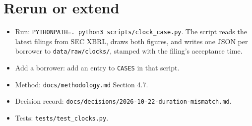 \documentclass[11pt,a4paper]{article}
\newcommand{\code}[1]{\texttt{\small #1}}
\begin{document}
\section{Rerun or extend}
\begin{itemize}
\item Run: \code{PYTHONPATH=. python3 scripts/clock\_case.py}. The script reads the latest filings from SEC XBRL, draws both figures, and writes one JSON per borrower to \code{data/raw/clocks/}, stamped with the filing's acceptance time.
\item Add a borrower: add an entry to \code{CASES} in that script.
\item Method: \code{docs/methodology.md} Section 4.7.
\item Decision record: \code{docs/decisions/}\allowbreak\code{2026-10-22-duration-mismatch.md}.
\item Tests: \code{tests/test\_clocks.py}.
\end{itemize}
\end{document}
